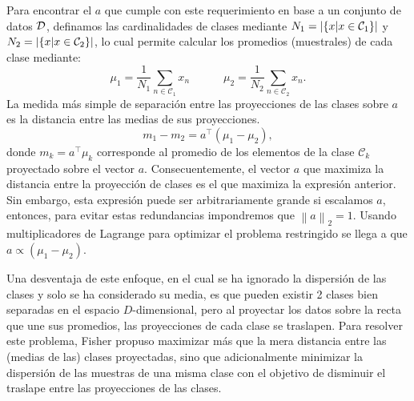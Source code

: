 Para encontrar el $a$ que cumple con este requerimiento en base a un conjunto de datos  ${\mathcal D}$, definamos las cardinalidades de clases mediante $N_1 = |\{x|x\in{\mathcal C}_1\}|$ y $N_2 = |\{x|x\in{\mathcal C}_2\}|$, lo cual permite calcular los promedios (muestrales) de cada  clase mediante: 
\begin{equation}
	\mu_1=\frac{1}{N_1}\sum_{n\in\mathcal{C}_1}x_n
	\quad\quad\quad
	\mu_2=\frac{1}{N_2}\sum_{n\in\mathcal{C}_2}x_n.
\end{equation}
La medida más simple de separación entre las proyecciones de las clases sobre $a$ es la distancia entre las medias  de sus proyecciones.
\begin{equation}
	m_1 - m_2 = a^\top(\mu_1-\mu_2),
\end{equation}
donde $m_k= a^\top\mu_k$ corresponde al promedio de los elementos de  la clase $\mathcal{C}_k$ proyectado sobre el  vector $a$. Consecuentemente, el vector $a$ que maximiza la distancia entre la proyección de clases es el que maximiza la expresión anterior. Sin embargo, esta expresión puede ser arbitrariamente grande si escalamos $a$, entonces, para evitar estas redundancias impondremos que $\left \| a \right \|_2=1$. Usando multiplicadores de Lagrange para optimizar el problema restringido se llega a que $a\propto(\mu_1-\mu_2)$. 

Una desventaja de este enfoque, en el cual se ha ignorado la dispersión de las clases y solo se ha considerado su media, es que pueden existir 2 clases bien separadas en el espacio $D$-dimensional, pero al proyectar los datos sobre la recta que une sus promedios, las proyecciones de cada clase se traslapen. Para resolver este problema, Fisher propuso maximizar más que la mera distancia entre las (medias de las) clases proyectadas, sino que adicionalmente minimizar la dispersión de las  muestras de una misma clase con el objetivo de disminuir el traslape entre las proyecciones de las clases. 

